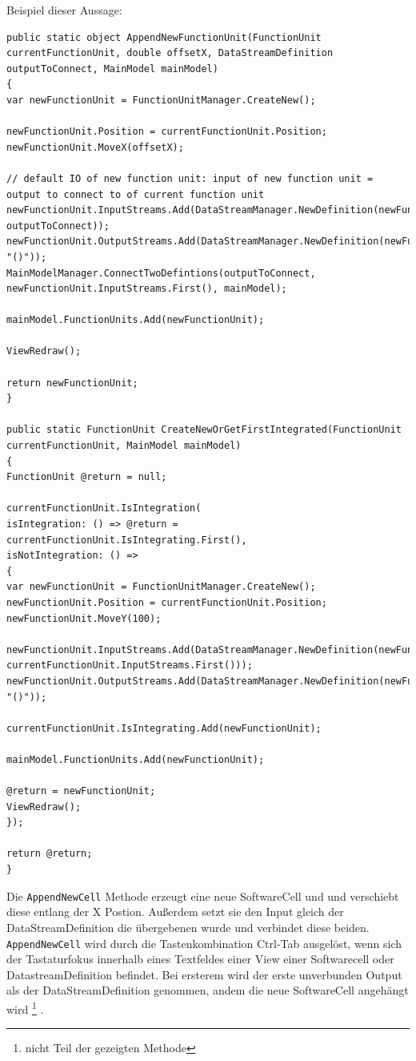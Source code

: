 Beispiel dieser Aussage:
\begin{verbatim}
public static object AppendNewFunctionUnit(FunctionUnit currentFunctionUnit, double offsetX, DataStreamDefinition outputToConnect, MainModel mainModel)
{
var newFunctionUnit = FunctionUnitManager.CreateNew();

newFunctionUnit.Position = currentFunctionUnit.Position;
newFunctionUnit.MoveX(offsetX);

// default IO of new function unit: input of new function unit = output to connect to of current function unit
newFunctionUnit.InputStreams.Add(DataStreamManager.NewDefinition(newFunctionUnit, outputToConnect));
newFunctionUnit.OutputStreams.Add(DataStreamManager.NewDefinition(newFunctionUnit, "()"));
MainModelManager.ConnectTwoDefintions(outputToConnect, newFunctionUnit.InputStreams.First(), mainModel);

mainModel.FunctionUnits.Add(newFunctionUnit);

ViewRedraw();

return newFunctionUnit;
}

public static FunctionUnit CreateNewOrGetFirstIntegrated(FunctionUnit currentFunctionUnit, MainModel mainModel)
{
FunctionUnit @return = null;

currentFunctionUnit.IsIntegration(
isIntegration: () => @return = currentFunctionUnit.IsIntegrating.First(),
isNotIntegration: () =>
{
var newFunctionUnit = FunctionUnitManager.CreateNew();
newFunctionUnit.Position = currentFunctionUnit.Position;
newFunctionUnit.MoveY(100);

newFunctionUnit.InputStreams.Add(DataStreamManager.NewDefinition(newFunctionUnit, currentFunctionUnit.InputStreams.First()));
newFunctionUnit.OutputStreams.Add(DataStreamManager.NewDefinition(newFunctionUnit, "()"));

currentFunctionUnit.IsIntegrating.Add(newFunctionUnit);

mainModel.FunctionUnits.Add(newFunctionUnit);

@return = newFunctionUnit;
ViewRedraw();
});

return @return;
}
\end{verbatim}





	Die \texttt{AppendNewCell} Methode erzeugt eine neue SoftwareCell und und
	verschiebt diese entlang der X Postion.
	Außerdem setzt sie den Input gleich der DataStreamDefinition die
	übergebenen wurde und verbindet diese beiden.
	\texttt{AppendNewCell} wird durch die Tastenkombination Ctrl-Tab ausgelöst, wenn
	sich der Tastaturfokus innerhalb eines Textfeldes einer View einer Softwarecell oder
	DatastreamDefinition befindet. Bei ersterem wird der erste unverbunden Output als der
	DataStreamDefinition genommen, andem die neue SoftwareCell angehängt wird \footnote{nicht Teil der gezeigten Methode} .
	
